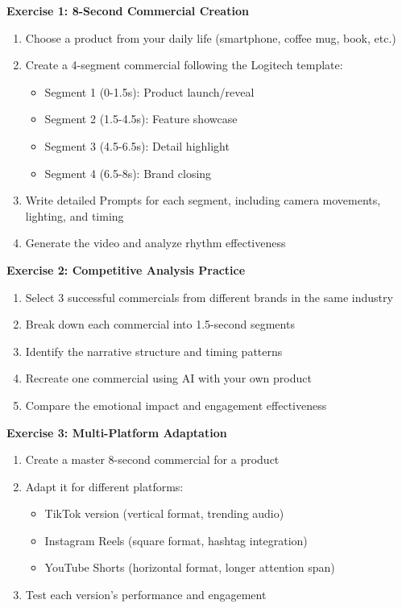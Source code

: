 \textbf{Exercise 1: 8-Second Commercial Creation}
\begin{enumerate}
\item Choose a product from your daily life (smartphone, coffee mug, book, etc.)
\item Create a 4-segment commercial following the Logitech template:
   \begin{itemize}
   \item Segment 1 (0-1.5s): Product launch/reveal
   \item Segment 2 (1.5-4.5s): Feature showcase
   \item Segment 3 (4.5-6.5s): Detail highlight
   \item Segment 4 (6.5-8s): Brand closing
   \end{itemize}
\item Write detailed Prompts for each segment, including camera movements, lighting, and timing
\item Generate the video and analyze rhythm effectiveness
\end{enumerate}

\textbf{Exercise 2: Competitive Analysis Practice}
\begin{enumerate}
\item Select 3 successful commercials from different brands in the same industry
\item Break down each commercial into 1.5-second segments
\item Identify the narrative structure and timing patterns
\item Recreate one commercial using AI with your own product
\item Compare the emotional impact and engagement effectiveness
\end{enumerate}

\textbf{Exercise 3: Multi-Platform Adaptation}
\begin{enumerate}
\item Create a master 8-second commercial for a product
\item Adapt it for different platforms:
   \begin{itemize}
   \item TikTok version (vertical format, trending audio)
   \item Instagram Reels (square format, hashtag integration)
   \item YouTube Shorts (horizontal format, longer attention span)
   \end{itemize}
\item Test each version's performance and engagement
\end{enumerate}

